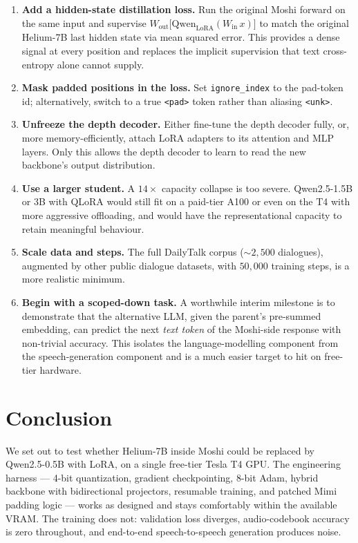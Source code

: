 \documentclass[conference]{IEEEtran}
\begin{document}
\begin{enumerate}
    \item \textbf{Add a hidden-state distillation loss.} Run the original Moshi forward on the same input and supervise $W_{\text{out}}\big[\text{Qwen}_{\text{LoRA}}(W_{\text{in}}\,x)\big]$ to match the original Helium-7B last hidden state via mean squared error. This provides a dense signal at every position and replaces the implicit supervision that text cross-entropy alone cannot supply.
    \item \textbf{Mask padded positions in the loss.} Set \texttt{ignore\_index} to the pad-token id; alternatively, switch to a true \texttt{<pad>} token rather than aliasing \texttt{<unk>}.
    \item \textbf{Unfreeze the depth decoder.} Either fine-tune the depth decoder fully, or, more memory-efficiently, attach LoRA adapters to its attention and MLP layers. Only this allows the depth decoder to learn to read the new backbone's output distribution.
    \item \textbf{Use a larger student.} A $14\times$ capacity collapse is too severe. Qwen2.5-1.5B or 3B with QLoRA would still fit on a paid-tier A100 or even on the T4 with more aggressive offloading, and would have the representational capacity to retain meaningful behaviour.
    \item \textbf{Scale data and steps.} The full DailyTalk corpus ($\sim 2{,}500$ dialogues), augmented by other public dialogue datasets, with $50{,}000$ training steps, is a more realistic minimum.
    \item \textbf{Begin with a scoped-down task.} A worthwhile interim milestone is to demonstrate that the alternative LLM, given the parent's pre-summed embedding, can predict the next \emph{text token} of the Moshi-side response with non-trivial accuracy. This isolates the language-modelling component from the speech-generation component and is a much easier target to hit on free-tier hardware.
\end{enumerate}

\section{Conclusion}
\label{sec:conclusion}

We set out to test whether Helium-7B inside Moshi could be replaced by Qwen2.5-0.5B with LoRA, on a single free-tier Tesla T4 GPU. The engineering harness --- 4-bit quantization, gradient checkpointing, 8-bit Adam, hybrid backbone with bidirectional projectors, resumable training, and patched Mimi padding logic --- works as designed and stays comfortably within the available VRAM. The training does not: validation loss diverges, audio-codebook accuracy is zero throughout, and end-to-end speech-to-speech generation produces noise.
\end{document}
